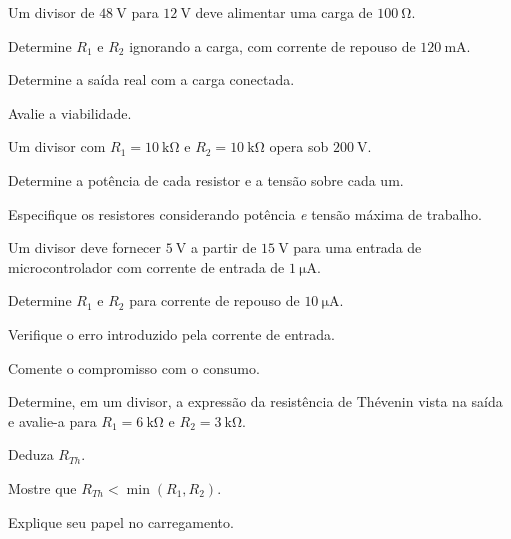 \begin{questao}[3]{}

Um divisor de $\SI{48}{\volt}$ para $\SI{12}{\volt}$ deve alimentar uma carga
de $\SI{100}{\ohm}$.
\begin{itensq}
\item Determine $R_1$ e $R_2$ ignorando a carga, com corrente de repouso de
      $\SI{120}{\milli\ampere}$.
\item Determine a saída real com a carga conectada.
\item Avalie a viabilidade.
\end{itensq}


\end{questao}
\begin{questao}[3]{}

Um divisor com $R_1=\SI{10}{\kilo\ohm}$ e $R_2=\SI{10}{\kilo\ohm}$ opera sob
$\SI{200}{\volt}$.
\begin{itensq}
\item Determine a potência de cada resistor e a tensão sobre cada um.
\item Especifique os resistores considerando potência \emph{e} tensão máxima de
      trabalho.
\end{itensq}


\end{questao}
\begin{questao}[3]{}

Um divisor deve fornecer $\SI{5}{\volt}$ a partir de $\SI{15}{\volt}$ para uma
entrada de microcontrolador com corrente de entrada de
$\SI{1}{\micro\ampere}$.
\begin{itensq}
\item Determine $R_1$ e $R_2$ para corrente de repouso de
      $\SI{10}{\micro\ampere}$.
\item Verifique o erro introduzido pela corrente de entrada.
\item Comente o compromisso com o consumo.
\end{itensq}


\end{questao}
\begin{questao}[3]{}

Determine, em um divisor, a expressão da resistência de Thévenin vista na saída
e avalie-a para $R_1=\SI{6}{\kilo\ohm}$ e $R_2=\SI{3}{\kilo\ohm}$.
\begin{itensq}
\item Deduza $R_{Th}$.
\item Mostre que $R_{Th}<\min(R_1,R_2)$.
\item Explique seu papel no carregamento.
\end{itensq}


\end{questao}
